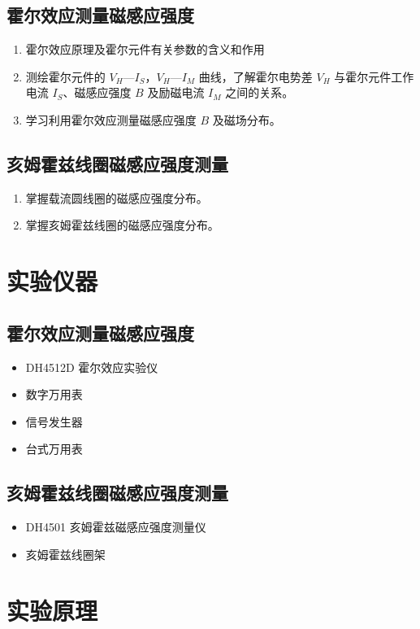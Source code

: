 \documentclass[zihao=5, UTF8]{article}
\theoremstyle{MyLineTheoremStyle} %
\theoremstyle{MyBlockTheoremStyle} %
\theoremstyle{MySubsubsectionStyle} %
\begin{document}
\subsection{霍尔效应测量磁感应强度}
\begin{enumerate}
    \item 霍尔效应原理及霍尔元件有关参数的含义和作用
    \item 测绘霍尔元件的 $V_H$—$I_S$，$V_H$—$I_M$ 曲线，了解霍尔电势差 $V_H$ 与霍尔元件工作电流 $I_S$、磁感应强度 $B$ 及励磁电流 $I_M$ 之间的关系。
    \item 学习利用霍尔效应测量磁感应强度 $B$ 及磁场分布。
\end{enumerate}

\subsection{亥姆霍兹线圈磁感应强度测量}
\begin{enumerate}
    \item 掌握载流圆线圈的磁感应强度分布。
    \item 掌握亥姆霍兹线圈的磁感应强度分布。
\end{enumerate}

\section{实验仪器}
\subsection{霍尔效应测量磁感应强度}
\begin{itemize}
    \item DH4512D 霍尔效应实验仪
    \item 数字万用表
    \item 信号发生器
    \item 台式万用表
\end{itemize}
\subsection{亥姆霍兹线圈磁感应强度测量}
\begin{itemize}
    \item DH4501 亥姆霍兹磁感应强度测量仪
    \item 亥姆霍兹线圈架
\end{itemize}

\section{实验原理}
\end{document}
